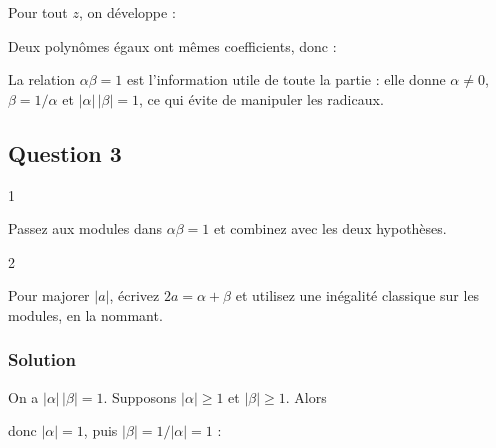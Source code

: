 \documentclass[11pt,a4paper]{article}
\newcommand{\equationajustee}[1]{%
  \sbox{\boiteequation}{$\displaystyle #1$}%
  \ifdim\wd\boiteequation>\linewidth
    \[\resizebox{\linewidth}{!}{\usebox{\boiteequation}}\]%
  \else
    \[#1\]%
  \fi}
\begin{document}
Pour tout \(z\), on développe :

\equationajustee{(z-\alpha)(z-\beta)=z^2-(\alpha+\beta)z+\alpha\beta.}

Deux polynômes égaux ont mêmes coefficients, donc :

\equationajustee{\boxed{\begin{aligned}\alpha+\beta&=2a\\ \alpha\beta&=1\end{aligned}}}

\begin{methode}

La relation \(\alpha\beta=1\) est l'information utile de toute la partie : elle donne \(\alpha\neq0\), \(\beta=1/\alpha\) et \(|\alpha|\,|\beta|=1\), ce qui évite de manipuler les radicaux.

\end{methode}

\hypertarget{question-3}{%
\subsection{Question 3}\label{question-3}}

\begin{indication}{1}

Passez aux modules dans \(\alpha\beta=1\) et combinez avec les deux hypothèses.

\end{indication}

\begin{indication}{2}

Pour majorer \(|a|\), écrivez \(2a=\alpha+\beta\) et utilisez une inégalité classique sur les modules, en la nommant.

\end{indication}

\hypertarget{solution-2}{%
\subsubsection{Solution}\label{solution-2}}

On a \(|\alpha|\,|\beta|=1\). Supposons \(|\alpha|\ge1\) et \(|\beta|\ge1\). Alors

\equationajustee{\begin{aligned}1=|\alpha|\,|\beta|&\ge|\alpha|\\ &\ge1,\end{aligned}}

donc \(|\alpha|=1\), puis \(|\beta|=1/|\alpha|=1\) :
\end{document}
